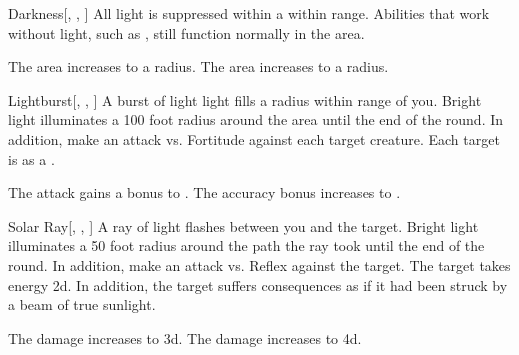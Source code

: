 \lowercase{\hypertarget{spell:Darkness}{}}\label{spell:Darkness}
\begin{freeability}[Rank 4]{\hypertarget{spell:Darkness}{Darkness}}[, , ]
\targetrule
All light is suppressed within a \areamed {} within \rngmed range.
Abilities that work without light, such as , still function normally in the area.

\rankline
{} The area increases to a \arealarge radius.
 The area increases to a \areahuge radius.
\end{freeability}
\vspace{0.25em}



\lowercase{\hypertarget{spell:Lightburst}{}}\label{spell:Lightburst}
\begin{freeability}[Rank 4]{\hypertarget{spell:Lightburst}{Lightburst}}[, , ]
A burst of light light fills a \areasmall radius  within \rngmed range of you.
Bright light illuminates a 100 foot radius around the area until the end of the round.
In addition, make an attack vs. Fortitude against each target creature.
\hit Each target is \dazzled as a .

\rankline
{} The attack gains a  bonus to .
 The accuracy bonus increases to .
\end{freeability}
\vspace{0.25em}



\lowercase{\hypertarget{spell:Solar Ray}{}}\label{spell:Solar Ray}
\begin{freeability}[Rank 4]{\hypertarget{spell:Solar Ray}{Solar Ray}}[, , ]
A ray of light flashes between you and the target.
Bright light illuminates a 50 foot radius around the path the ray took until the end of the round.
In addition, make an attack vs. Reflex against the target.
\hit The target takes energy  \plus2d.
In addition, the target suffers consequences as if it had been struck by a beam of true sunlight.

\rankline
{} The damage increases to  \plus3d.
 The damage increases to  \plus4d.
\end{freeability}
\vspace{0.25em}



